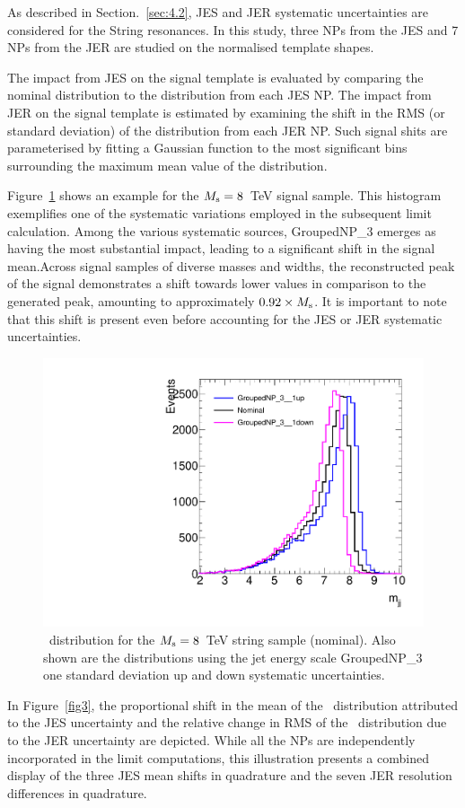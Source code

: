 As described in Section.~\ref{sec:4.2}, JES and JER systematic uncertainties are considered for the String resonances. In this study, three NPs from the JES and 7 NPs from the JER are studied on the normalised template shapes. 

The impact from JES on the signal template is evaluated by comparing the nominal distribution to the distribution from each JES NP. The impact from JER on the signal template is estimated by examining the shift in the RMS (or standard deviation) of the distribution from each JER NP. Such signal shits are parameterised by fitting a Gaussian function to the most significant bins surrounding the maximum mean value of the distribution.


Figure~\ref{fig2} shows an example for the $M_\mathrm{s} = 8$~TeV signal sample.
This histogram exemplifies one of the systematic variations employed in the subsequent limit calculation. Among the various systematic sources, GroupedNP\_3 emerges as having the most substantial impact, leading to a significant shift in the signal mean.Across signal samples of diverse masses and widths, the reconstructed peak of the signal demonstrates a shift towards lower values in comparison to the generated peak, amounting to approximately $0.92 \times M_\mathrm{s}$. It is important to note that this shift is present even before accounting for the JES or JER systematic uncertainties.

\begin{figure}[htb]
\begin{center}
\includegraphics[width=0.65\linewidth]{fig/strings/JES_shift}
\end{center}
\caption{\mjj\ distribution for the $M_\mathrm{s} = 8$~TeV string sample (nominal).
Also shown are the distributions using the jet energy scale
GroupedNP\_3 one standard deviation up and down systematic uncertainties.}
\label{fig2}
\end{figure}

In Figure~\ref{fig3}, the proportional shift in the mean of the \mjj\ distribution attributed to the JES uncertainty and the relative change in RMS
of the \mjj\ distribution due to the JER uncertainty are depicted.
While all the NPs are independently incorporated in the limit computations, this illustration presents a combined display of the three JES mean shifts in quadrature and the seven JER resolution differences in quadrature.

